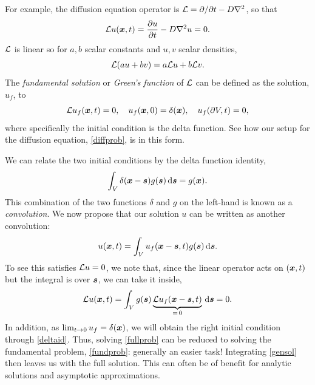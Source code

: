 \documentclass[main.tex]{subfiles}
\begin{document}
For example, the diffusion equation operator is $\Lin = \pd{}{t}- D\nabla^2$, so that 
\begin{equation}
\Lin u(\v{x},t) = \pd{u}{t} -D\nabla^2 u = 0.
\end{equation}
$\mathcal{L}$ is linear so for $a,b$ scalar constants and $u,v$ scalar densities,
\begin{equation}
\mathcal{L}(au+bv) = a\mathcal{L} u  + b\mathcal{L} v.
\end{equation}
The \emph{fundamental solution} or \emph{Green's function} of $\mathcal{L}$ can be defined as the solution, $u_f$, to
\begin{equation}
\label{fundprob}
\Lin u_f(\v{x},t) =  0, \quad u_f(\v{x},0) = \delta(\v{x}), \quad  u_f(\partial{V},t) = 0,
\end{equation}
where specifically the initial condition is the delta function. See how our setup for the diffusion equation, \cref{diffprob}, is in this form.

We can relate the two initial conditions by the delta function identity,
\begin{equation}
\label{deltaid}
\int_{V}\delta(\v{x}- \v{s})g(\v{s})\,\d\v{s} = g(\v{x}).
\end{equation}
This combination of the two functions $\delta$ and $g$ on the left-hand is known as a \emph{convolution}. We now propose that our solution $u$ can be written as another convolution:
\begin{equation}
\label{gensol}
u(\v{x},t) = \int_{V}u_f(\v{x}-\v{s},t) g(\v{s})\,\d\v{s}.
\end{equation}
To see this satisfies $\mathcal{L} u = 0$, we note that, since the linear operator acts on $(\v{x},t)$ but the integral is over $\v{s}$, we can take it inside,
\begin{equation}
\label{lingreen}
\Lin u(\v{x},t) = \int_{V}g(\v{s})\underbrace{\Lin u_f(\v{x}-\v{s},t)}_{=\,0}\,\d\v{s} = 0.
\end{equation}
In addition, as $\lim_{t \to 0} u_f  = \delta(\v{x})$, we will obtain the right initial condition through \cref{deltaid}. Thus, solving \cref{fullprob} can be reduced to solving the fundamental problem, \cref{fundprob}: generally an easier task! Integrating \cref{gensol} then leaves us with the full solution. This can often be of benefit for analytic solutions and asymptotic approximations.
\end{document}
